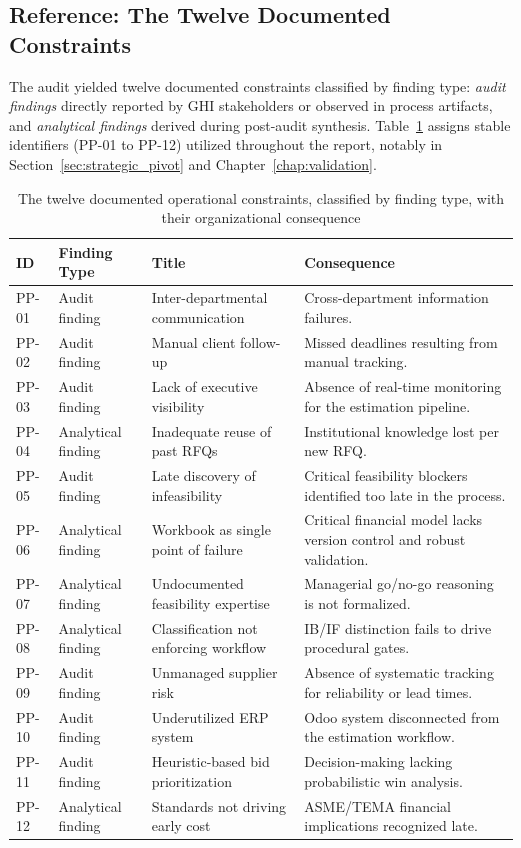 \subsection{Reference: The Twelve Documented Constraints}
The audit yielded twelve documented constraints classified by finding type: \textit{audit findings} directly reported by GHI stakeholders or observed in process artifacts, and \textit{analytical findings} derived during post-audit synthesis. Table~\ref{tab:pain_points} assigns stable identifiers (PP-01 to PP-12) utilized throughout the report, notably in Section~\ref{sec:strategic_pivot} and Chapter~\ref{chap:validation}.

\begin{table}[H]
\centering
\renewcommand{\arraystretch}{1.1}
\scriptsize
\begin{tabularx}{\textwidth}{|p{0.8cm}|p{2.2cm}|>{\RaggedRight\arraybackslash}X|>{\RaggedRight\arraybackslash}X|}
\hline
\rowcolor{lightgray}
\textbf{ID} & \textbf{Finding Type} & \textbf{Title} & \textbf{Consequence} \\ \hline
PP-01 & Audit finding & Inter-departmental communication & Cross-department information failures. \\ \hline
PP-02 & Audit finding & Manual client follow-up & Missed deadlines resulting from manual tracking. \\ \hline
PP-03 & Audit finding & Lack of executive visibility & Absence of real-time monitoring for the estimation pipeline. \\ \hline
PP-04 & Analytical finding & Inadequate reuse of past RFQs & Institutional knowledge lost per new RFQ. \\ \hline
PP-05 & Audit finding & Late discovery of infeasibility & Critical feasibility blockers identified too late in the process. \\ \hline
PP-06 & Analytical finding & Workbook as single point of failure & Critical financial model lacks version control and robust validation. \\ \hline
PP-07 & Analytical finding & Undocumented feasibility expertise & Managerial go/no-go reasoning is not formalized. \\ \hline
PP-08 & Analytical finding & Classification not enforcing workflow & IB/IF distinction fails to drive procedural gates. \\ \hline
PP-09 & Audit finding & Unmanaged supplier risk & Absence of systematic tracking for reliability or lead times. \\ \hline
PP-10 & Audit finding & Underutilized ERP system & Odoo system disconnected from the estimation workflow. \\ \hline
PP-11 & Audit finding & Heuristic-based bid prioritization & Decision-making lacking probabilistic win analysis. \\ \hline
PP-12 & Analytical finding & Standards not driving early cost & ASME/TEMA financial implications recognized late. \\ \hline
\end{tabularx}
\caption{The twelve documented operational constraints, classified by finding type, with their organizational consequence}
\label{tab:pain_points}
\end{table}

